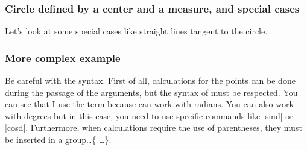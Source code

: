 \newpage

\subsubsection{Circle defined by a center and a measure, and special cases}

Let's look at some special cases like straight lines tangent to the circle.

\begin{tkzexample}[latex=6.35cm,small]
\end{tkzexample}

\subsubsection{More complex example}

\tkzHandBomb{}Be careful with the syntax. First of all, calculations for the
points can be done during the passage of the arguments, but the syntax of
 must be respected. You can see that I use the term 
because  can work with radians. You can also work with degrees but
in this case, you need to use  specific commands like |sind| or |cosd|.
Furthermore, when calculations require the use of parentheses, they must be
inserted in a group\dots \TEX \{ \dots \}.

\begin{tkzexample}[latex=6.35cm,small]
\end{tkzexample}

